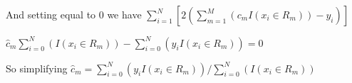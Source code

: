 \documentclass[11pt]{article}
\begin{document}
\vspace{3 mm}
\noindent
And setting equal to 0 we have $\sum\limits_{i=1}^N [2(\sum\limits_{m=1}^M (c_{m}I(x_{i} \in R_{m})) - y_{i})]$ 






\vspace{3 mm}
\noindent
$ \hat{c}_{m}\sum\limits_{i=0}^N (I(x_{i} \in R_{m})) - \sum\limits_{i=0}^N (y_{i} I(x_{i} \in R_{m})) = 0$

\vspace{3 mm}
\noindent
So simplifying $ \hat{c}_{m} = \sum\limits_{i=0}^N (y_{i} I(x_{i} \in R_{m})) / \sum\limits_{i=0}^N (I(x_{i} \in R_{m}))$
\end{document}
